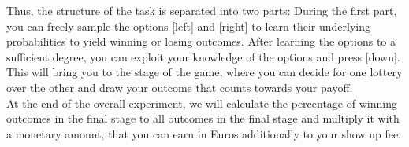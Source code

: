 \documentclass[12pt, oneside]{scrartcl}
\begin{document}
Thus, the structure of the task is separated into two parts: During the first part, you can freely sample the options [left] and [right] to learn their underlying probabilities to yield winning or losing outcomes. After learning the options to a sufficient degree, you can exploit your knowledge of the options and press [down]. This will bring you to the stage of the game, where you can decide for one lottery over the other and draw your outcome that counts towards your payoff. \\

At the end of the overall experiment, we will calculate the percentage of winning outcomes in the final stage to all outcomes in the final stage and multiply it with a monetary amount, that you can earn in Euros additionally to your show up fee.

\pagebreak
\end{document}
